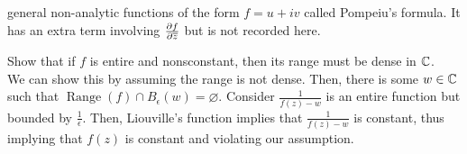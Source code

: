 \documentclass[11pt,leqno,oneside]{amsart}
\numberwithin{thm}{section}
\begin{document}
  general non-analytic functions of the form $f=u+iv$ called Pompeiu's
  formula. It has an extra term involving $\frac{\partial f}{\partial
    \overline{z}}$ but is not recorded here.
  \begin{example}
    Show that if $f$ is entire and nonsconstant, then its range must
    be dense in ${\mathbb C}$. \\

    We can show this by assuming the range is not dense. Then, there
    is some $w \in {\mathbb C}$ such that $\operatorname{Range}(f) \cap
    B_\epsilon(w) = \varnothing$. Consider $\frac{1}{f(z)-w}$ is an
    entire function but bounded by $\frac{1}{\epsilon}$. Then,
    Liouville's function implies that $\frac{1}{f(z)-w}$ is constant,
    thus implying that $f(z)$ is constant and violating our assumption.
  \end{example}
\end{document}
